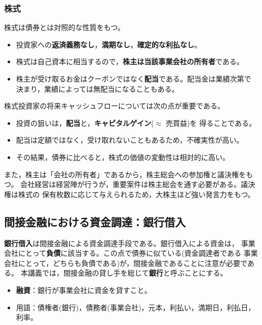 \subsubsection{株式}

株式は債券とは対照的な性質をもつ。

\begin{itemize}
\item 投資家への\textbf{返済義務なし}，\textbf{満期なし}，\textbf{確定的な利払なし}。
\item 株式は自己資本に相当するので，\textbf{株主は当該事業会社の所有者}である。
\item 株主が受け取るお金はクーポンではなく\textbf{配当}である。配当金は業績次第で
決まり，業績によっては無配当になることもある。
\end{itemize}

株式投資家の将来キャッシュフローについては次の点が重要である。
\begin{itemize}
\item 投資の狙いは，\textbf{配当}と，\textbf{キャピタルゲイン}($\approx$ 売買益)を
得ることである。
\item 配当は定額ではなく，受け取れないこともあるため，不確実性が高い。
\item その結果，債券に比べると，株式の価値の変動性は相対的に高い。
\end{itemize}

また，株主は「会社の所有者」であるから，株主総会への参加権と議決権をもつ。
会社経営は経営陣が行うが，重要案件は株主総会を通す必要がある。議決権は株式の
保有枚数に応じて与えられるため，大株主ほど強い発言力をもつ。

\subsection{間接金融における資金調達：銀行借入}

\textbf{銀行借入}は間接金融による資金調達手段である。銀行借入による資金は，
事業会社にとって\textbf{負債}に該当する。この点で債券に似ている(資金調達者である
事業会社にとって，どちらも負債である)が，間接金融であることに注意が必要である。
本講義では，間接金融の貸し手を総じて\textbf{銀行}と呼ぶことにする。

\begin{itemize}
\item \textbf{融資}：銀行が事業会社に資金を貸すこと。
\item 用語：債権者(銀行)，債務者(事業会社)，元本，利払い，満期日，利払日，利率。
\end{itemize}

